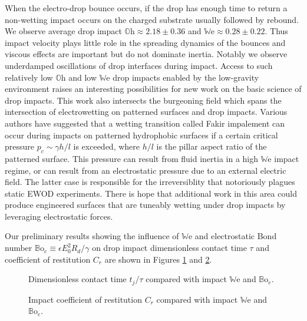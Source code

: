 \documentclass[aip,reprint, floatfix]{revtex4-1}
\begin{document}
When the electro-drop bounce occurs, if the drop has enough time to return a non-wetting impact occurs on the charged substrate usually followed by rebound. We observe average drop impact $\mathbb{O}\mbox{h} \approx 2.18 \pm 0.36$ and  $\mathbb{W}\mbox{e} \approx 0.28 \pm 0.22$. Thus impact velocity plays little role in the spreading dynamics of the bounces and viscous effects are important but do not dominate inertia. Notably we observe underdamped oscillations of drop interfaces during impact. Access to such relatively low $\mathbb{O}\mbox{h}$ and low $\mathbb{W}\mbox{e}$ drop impacts enabled by the low-gravity environment raises an interesting possibilities for new work on the basic science of drop impacts. This work also intersects the burgeoning field which spans the intersection of electrowetting on patterned surfaces and drop impacts. Various authors \cite{bartolo_bouncing_2006, reyssat_bouncing_2006} have suggested that a wetting transition called Fakir impalement can occur during impacts on patterned hydrophobic surfaces if a certain critical pressure $p_c \sim \gamma h/l$ is exceeded, where $h/l$ is the pillar aspect ratio of the patterned surface. This pressure can result from fluid inertia in a high $\mathbb{W}\mbox{e}$ impact regime, or can result from an electrostatic pressure due to an external electric field. The latter case is responsible for the irreversiblity that notoriously plagues static EWOD experiments. There is hope that additional work in this area could produce engineered surfaces that are tuneably wetting under drop impacts by leveraging electrostatic forces.
 
Our preliminary results showing the influence of $\mathbb{W}\mbox{e}$ and electrostatic Bond number $\mathbb{B}\mbox{o}_e \equiv \epsilon E_0^2 R_d/\gamma $ on drop impact dimensionless contact time $\tau$ and coefficient of restitution $C_r$ are shown in Figures \ref{fig:contact} and \ref{fig:restitution}.

\begin{figure}[htb]
    \centering
    \resizebox{0.5\textwidth}{!}{}
    \caption{Dimensionless contact time $t_j/\tau$ compared with impact $\mathbb{W}\mbox{e}$ and $\mathbb{B}\mbox{o}_e$.\label{fig:contact}}
\end{figure}

\begin{figure}[htb]
    \centering
    \resizebox{0.5\textwidth}{!}{}
    \caption{Impact coefficient of restitution $C_r$ compared with impact $\mathbb{W}\mbox{e}$ and $\mathbb{B}\mbox{o}_e$.\label{fig:restitution}}
\end{figure}
\end{document}
